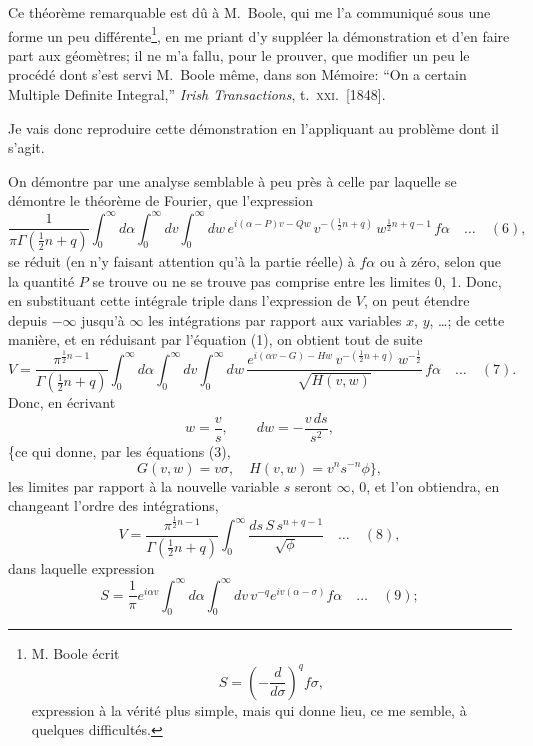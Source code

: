 \documentclass[11pt]{article}
\begin{document}

Ce th\'eor\`eme remarquable est d\^u \`a M.~Boole, qui me l'a communiqu\'e sous une
forme un peu diff\'erente\footnote{M. Boole \'ecrit
\[
S = \left(-\frac{d}{d\sigma}\right)^{q}\!\!f\sigma,
\]
expression \`a la v\'erit\'e plus simple, mais qui donne lieu, ce me semble, \`a quelques difficult\'es.}, en me priant d'y suppl\'eer la d\'emonstration et d'en faire
part aux g\'eom\`etres; il ne m'a fallu, pour le prouver, que modifier un peu le proc\'ed\'e
dont s'est servi M.~Boole m\^eme, dans son M\'emoire: ``On a certain Multiple Definite
Integral,'' \textit{Irish Transactions}, t.~\textsc{xxi}.\ [1848].

\medskip
Je vais donc reproduire cette d\'emonstration en l'appliquant au probl\`eme dont il
s'agit.

\medskip
On d\'emontre par une analyse semblable \`a peu pr\`es \`a celle par laquelle se d\'emontre
le th\'eor\`eme de Fourier, que l'expression
\[
\frac{1}{\pi\Gamma(\tfrac{1}{2}n + q)}\int_{0}^{\infty}d\alpha\int_{0}^{\infty}dv\int_{0}^{\infty}dw\,e^{i(\alpha - P)v - Qw}\,v^{-(\tfrac{1}{2}n + q)}\,w^{\tfrac{1}{2}n + q - 1}\,f\alpha\quad\ldots\quad (6),
\]
se r\'eduit (en n'y faisant attention qu'\`a la partie r\'eelle) \`a $f\alpha$ ou \`a z\'ero, selon que
la quantit\'e $P$ se trouve ou ne se trouve pas comprise entre les limites 0, 1. Donc,
en substituant cette int\'egrale triple dans l'expression de $V$, on peut \'etendre depuis
$-\infty$ jusqu'\`a $\infty$ les int\'egrations par rapport aux variables $x$, $y$, \ldots; de cette mani\`ere,
et en r\'eduisant par l'\'equation (1), on obtient tout de suite
\[
V = \frac{\pi^{\frac{1}{2}n - 1}}{\Gamma(\tfrac{1}{2}n + q)}\int_{0}^{\infty}d\alpha\int_{0}^{\infty}dv\int_{0}^{\infty}dw\,\frac{e^{i(\alpha v - G) - Hw}\,v^{-(\tfrac{1}{2}n + q)}\,w^{-\tfrac{1}{2}}}{\sqrt{H(v,w)}}\,f\alpha\quad\ldots\quad (7).
\]
Donc, en \'ecrivant
\[
w = \frac{v}{s},\qquad dw = -\frac{v\,ds}{s^{2}},
\]
\{ce qui donne, par les \'equations (3),
\[
G(v, w) = v\sigma,\quad H(v, w) = v^{n}s^{-n}\phi\},
\]
les limites par rapport \`a la nouvelle variable $s$ seront $\infty$, $0$, et l'on obtiendra, en
changeant l'ordre des int\'egrations,
\[
V = \frac{\pi^{\frac{1}{2}n - 1}}{\Gamma(\tfrac{1}{2}n + q)}\int_{0}^{\infty}\frac{ds\,S\,s^{n + q - 1}}{\sqrt{\phi}}\quad\ldots\quad (8),
\]
dans laquelle expression
\[
S = \frac{1}{\pi}e^{i\alpha v}\int_{0}^{\infty}d\alpha\int_{0}^{\infty}dv\,v^{-q}e^{iv(\alpha - \sigma)}f\alpha\quad\ldots\quad (9);
\]
\end{document}
